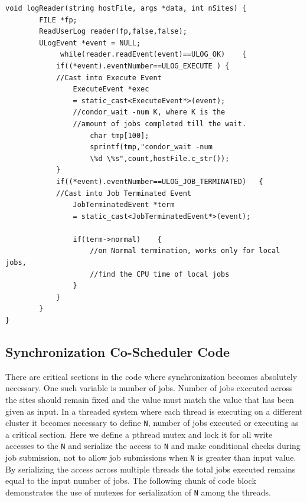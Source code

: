 \documentclass[ms,electronic,double]{nuthesis}
\begin{document}
\begin{lstlisting}
void logReader(string hostFile, args *data, int nSites)	{		
		FILE *fp;
		ReadUserLog reader(fp,false,false);
		ULogEvent *event = NULL;		
             while(reader.readEvent(event)==ULOG_OK)	{                    
            if((*event).eventNumber==ULOG_EXECUTE )	{                                
            //Cast into Execute Event
                ExecuteEvent *exec 
                = static_cast<ExecuteEvent*>(event);                                       
                //condor_wait -num K, where K is the 
                //amount of jobs completed till the wait.
                    char tmp[100];
                    sprintf(tmp,"condor_wait -num 
                    \%d \%s",count,hostFile.c_str());
            }            
            if((*event).eventNumber==ULOG_JOB_TERMINATED)	{                
            //Cast into Job Terminated Event
                JobTerminatedEvent *term 
                = static_cast<JobTerminatedEvent*>(event);                
                
                if(term->normal)	{                    
                    //on Normal termination, works only for local jobs, 
                    //find the CPU time of local jobs
                }               
            }
        }
}

\end{lstlisting}
\subsection{Synchronization Co-Scheduler Code}

There are critical sections in the code where synchronization becomes absolutely 
necessary. One such variable is number of jobs. Number of jobs executed across 
the sites should remain fixed and the value must match the value that has been 
given as input. In a threaded system where each thread is executing on a 
different cluster it becomes necessary to define \texttt{N}, number of jobs executed or executing as a 
critical section. Here we define a pthread mutex and lock it for all write accesses to the \texttt{N}
and serialize the access to \texttt{N} and make conditional checks during job submission, not to allow
job submissions when \texttt{N} is greater than input value. By 
serializing the access across multiple threads the total jobs executed remains 
equal to the input number of jobs. The following chunk of code block 
demonstrates the use of mutexes for serialization of  \texttt{N} among the threads.
\end{document}
